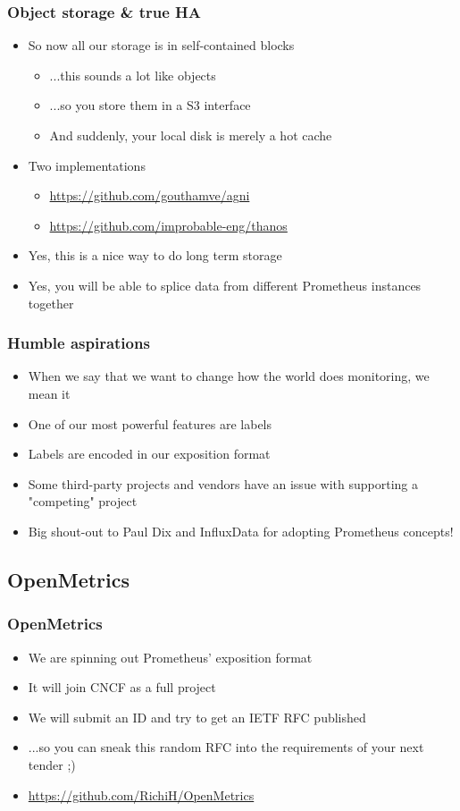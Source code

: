 \documentclass[t]{beamer}
\begin{document}
\begin{frame}
	\frametitle{Object storage \& true HA}
	\begin{itemize}
		\item So now all our storage is in self-contained blocks
		\begin{itemize}
			\item ...this sounds a lot like objects
			\item ...so you store them in a S3 interface
			\item And suddenly, your local disk is merely a hot cache
		\end{itemize}
		\item Two implementations
		\begin{itemize}
			\item \url{https://github.com/gouthamve/agni}
			\item \url{https://github.com/improbable-eng/thanos}
		\end{itemize}
		\item Yes, this is a nice way to do long term storage
		\item Yes, you will be able to splice data from different Prometheus instances together
	\end{itemize}
\end{frame}

\begin{frame}
	\frametitle{Humble aspirations}
	\begin{itemize}
		\item When we say that we want to change how the world does monitoring, we mean it
		\item One of our most powerful features are labels
		\item Labels are encoded in our exposition format
		\item Some third-party projects and vendors have an issue with supporting a "competing" project
		\item Big shout-out to Paul Dix and InfluxData for adopting Prometheus concepts!
	\end{itemize}
\end{frame}


\subsection{OpenMetrics}

\begin{frame}
	\frametitle{OpenMetrics}
	\begin{itemize}
		\item We are spinning out Prometheus' exposition format
		\item It will join CNCF as a full project
		\item We will submit an ID and try to get an IETF RFC published
		\item ...so you can sneak this random RFC into the requirements of your next tender ;)
		\item \url{https://github.com/RichiH/OpenMetrics}
	\end{itemize}
\end{frame}
\end{document}
